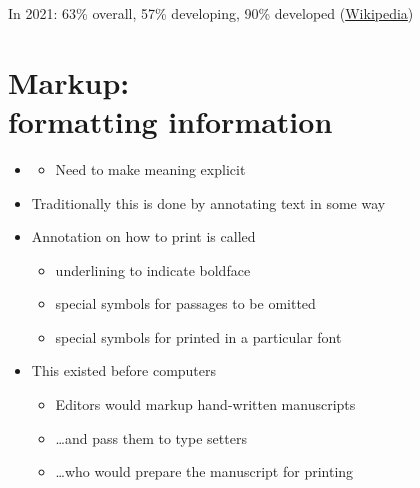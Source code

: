 \documentclass[a4paper,landscape,headrule,footrule,xetex]{foils}
\begin{document}
In 2021: 63\% overall, 57\% developing, 90\% developed (\href{https://en.wikipedia.org/wiki/List_of_countries_by_number_of_Internet_users}{Wikipedia})


\section{Markup: \\ formatting information}

\MyLogo{}

\begin{itemize}
\item {}
  \begin{itemize}
  \item Need to make meaning explicit
  \end{itemize}
\item Traditionally this is done by annotating text in some way
\end{itemize}


\begin{itemize}
\item Annotation on how to print is called 
  \begin{itemize}
  \item  underlining to indicate boldface
  \item special symbols for passages to be omitted
  \item special symbols for printed in a particular font
  \end{itemize}
\item This existed before computers
  \begin{itemize}
  \item Editors would markup hand-written manuscripts
  \item \ldots and pass them to type setters
  \item \ldots who would prepare the manuscript for printing
  \end{itemize}
\end{itemize}

\end{document}

